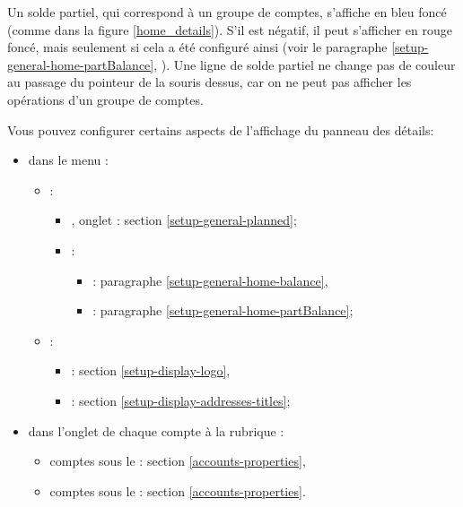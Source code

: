 Un solde partiel, qui correspond à un groupe de comptes, s'affiche en \textcolor[RGB]{40,40,255}{bleu foncé} (comme dans la figure \vref{home_details}). S'il est négatif, il peut s'afficher en \textcolor[RGB]{153,0,0}{rouge foncé}, mais seulement si cela a été configuré ainsi (voir le paragraphe \vref{setup-general-home-partBalance}, ). Une ligne de solde partiel ne change pas de couleur au passage du pointeur de la souris dessus, car on ne peut pas afficher les opérations d'un groupe de comptes.

Vous pouvez configurer certains aspects de l'affichage du panneau des détails:
\begin{itemize}
	\item dans le menu : %
		\begin{itemize}
			\item {}:
				\begin{itemize}[label=-]
					\item {}, onglet : section \vref{setup-general-planned};
					\item {}:
						\begin{itemize}[label=*]
							\item {}: paragraphe \vref{setup-general-home-balance},
							\item {}: paragraphe \vref{setup-general-home-partBalance};
						\end{itemize}
				\end{itemize}
			\item {}:
				\begin{itemize}[label=-]
					\item {}: section \vref{setup-display-logo},
					\item {}: section \vref{setup-display-addresses-titles};
				\end{itemize}
		\end{itemize}
	\item dans l'onglet  de chaque compte à la rubrique :
		\begin{itemize}
			 \item comptes sous le : section \vref{accounts-properties},
			 \item comptes sous le : section \vref{accounts-properties}.
		\end{itemize}
\end{itemize}

